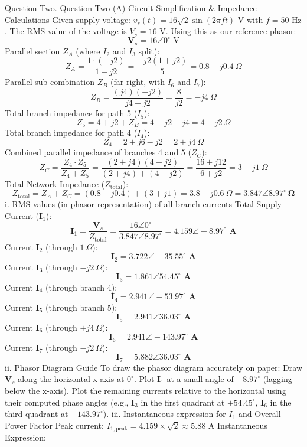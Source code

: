 Question Two.
Question Two (A)
Circuit Simplification & Impedance Calculations
Given supply voltage: $v_s(t) = 16\sqrt{2}\sin(2\pi f t)\text{ V}$ with $f = 50\text{ Hz}$.
The RMS value of the voltage is $V_s = 16\text{ V}$. Using this as our reference phasor:
$$\mathbf{V}_s = 16\angle 0^\circ\text{ V}$$ 
Parallel section $Z_A$ (where $I_2$ and $I_3$ split):
$$Z_A = \frac{1 \cdot (-j2)}{1 - j2} = \frac{-j2(1 + j2)}{5} = 0.8 - j0.4\ \Omega$$ 
Parallel sub-combination $Z_B$ (far right, with $I_6$ and $I_7$):
$$Z_B = \frac{(j4)(-j2)}{j4 - j2} = \frac{8}{j2} = -j4\ \Omega$$ 
Total branch impedance for path 5 ($I_5$):
$$Z_5 = 4 + j2 + Z_B = 4 + j2 - j4 = 4 - j2\ \Omega$$ 
Total branch impedance for path 4 ($I_4$):
$$Z_4 = 2 + j6 - j2 = 2 + j4\ \Omega$$ 
Combined parallel impedance of branches 4 and 5 ($Z_C$):
$$Z_C = \frac{Z_4 \cdot Z_5}{Z_4 + Z_5} = \frac{(2 + j4)(4 - j2)}{(2 + j4) + (4 - j2)} = \frac{16 + j12}{6 + j2} = 3 + j1\ \Omega$$ 
Total Network Impedance ($Z_{\text{total}}$):
$$Z_{\text{total}} = Z_A + Z_C = (0.8 - j0.4) + (3 + j1) = 3.8 + j0.6\ \Omega = \mathbf{3.847\angle 8.97^\circ\ \Omega}$$ 
i. RMS values (in phasor representation) of all branch currents
Total Supply Current ($\mathbf{I}_1$):
$$\mathbf{I}_1 = \frac{\mathbf{V}_s}{Z_{\text{total}}} = \frac{16\angle 0^\circ}{3.847\angle 8.97^\circ} = \mathbf{4.159\angle -8.97^\circ\text{ A}}$$ 
Current $\mathbf{I}_2$ (through $1\ \Omega$):
$$\mathbf{I}_2 = \mathbf{3.722\angle -35.55^\circ\text{ A}}$$ 
Current $\mathbf{I}_3$ (through $-j2\ \Omega$):
$$\mathbf{I}_3 = \mathbf{1.861\angle 54.45^\circ\text{ A}}$$ 
Current $\mathbf{I}_4$ (through branch 4):
$$\mathbf{I}_4 = \mathbf{2.941\angle -53.97^\circ\text{ A}}$$ 
Current $\mathbf{I}_5$ (through branch 5):
$$\mathbf{I}_5 = \mathbf{2.941\angle 36.03^\circ\text{ A}}$$ 
Current $\mathbf{I}_6$ (through $+j4\ \Omega$):
$$\mathbf{I}_6 = \mathbf{2.941\angle -143.97^\circ\text{ A}}$$ 
Current $\mathbf{I}_7$ (through $-j2\ \Omega$):
$$\mathbf{I}_7 = \mathbf{5.882\angle 36.03^\circ\text{ A}}$$ 
ii. Phasor Diagram Guide
To draw the phasor diagram accurately on paper:
Draw $\mathbf{V}_s$ along the horizontal x-axis at $0^\circ$.
Plot $\mathbf{I}_1$ at a small angle of $-8.97^\circ$ (lagging below the x-axis).
Plot the remaining currents relative to the horizontal using their computed phase angles (e.g., $\mathbf{I}_3$ in the first quadrant at $+54.45^\circ$, $\mathbf{I}_6$ in the third quadrant at $-143.97^\circ$).
iii. Instantaneous expression for $I_1$ and Overall Power Factor
Peak current: $I_{1,\text{peak}} = 4.159 \times \sqrt{2} \approx 5.88\text{ A}$
Instantaneous Expression:
